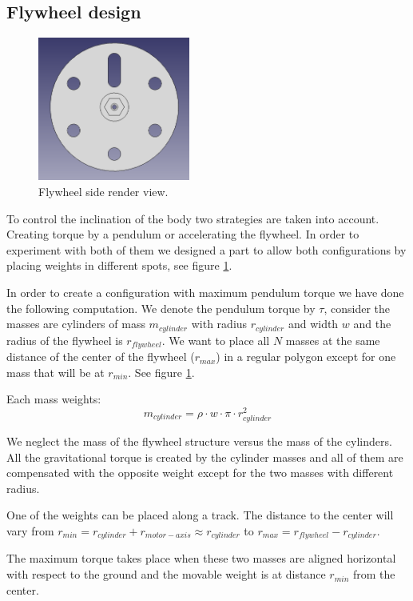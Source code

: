 \subsection{Flywheel design} \label{sec: flywheel design}
\begin{figure}
	\centering
	\includegraphics[width=5cm]{img/fly_wheel_side.png}
	\caption{Flywheel side render view.}
	\label{fig:Fly wheel side render view}
\end{figure}

To control the inclination of the body two strategies are taken into account.
Creating torque by a pendulum or accelerating the flywheel.
In order to experiment with both of them we designed a part to allow
both configurations by placing weights in different spots, see figure
\ref{fig:Fly wheel side render view}.

In order to create a configuration with maximum pendulum torque
we have done the following computation. We denote the pendulum
torque by $\tau$, consider the masses are cylinders of mass $m_{cylinder}$
with radius $r_{cylinder}$ and width $w$ and the radius of the flywheel is $r_{flywheel}$.
We want to place all $N$ masses at the same distance of the center of the flywheel ($r_{max}$) in
a regular polygon except for one mass that will be at $r_{min}$. See figure \ref{fig:Fly wheel side render view}.

Each mass weights:
\[ m_{cylinder} = \rho \cdot w \cdot \pi \cdot r_{cylinder}^2 \]

We neglect the mass of the flywheel structure versus the mass of the cylinders. All
the gravitational torque is created by the cylinder masses and all of them are compensated
with the opposite weight except for the two masses with different radius.

One of the weights can be placed along a track. The distance to the center will
vary from $r_{min} = r_{cylinder} + r_{motor-axis} \approx r_{cylinder} $ to $r_{max} = r_{flywheel} - r_{cylinder}$.

The maximum torque takes place when these two masses are aligned horizontal with respect to the ground and the movable weight is at distance $r_{min}$ from the center.

